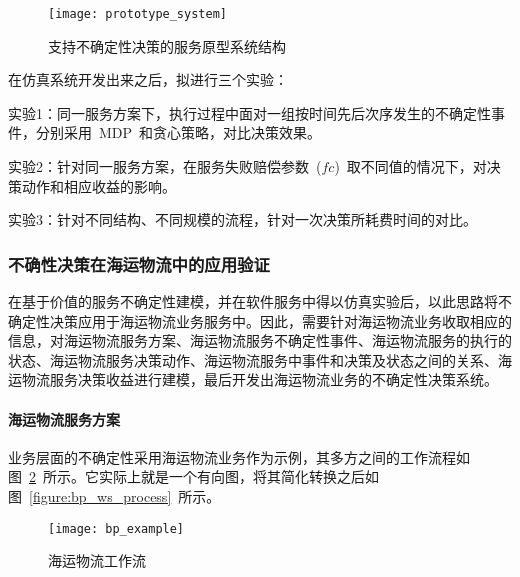 \begin{figure}[htbp]
    \centering
    \texttt{[image: prototype\_system]}
    \caption{支持不确定性决策的服务原型系统结构}\label{figure:prototype_system}
    \vspace{-1em}
\end{figure}


在仿真系统开发出来之后，拟进行三个实验：

实验1：同一服务方案下，执行过程中面对一组按时间先后次序发生的不确定性事件，分别采用~MDP~和贪心策略，对比决策效果。

实验2：针对同一服务方案，在服务失败赔偿参数~($fc$)~取不同值的情况下，对决策动作和相应收益的影响。

实验3：针对不同结构、不同规模的流程，针对一次决策所耗费时间的对比。

\subsubsection{不确性决策在海运物流中的应用验证}

在基于价值的服务不确定性建模，并在软件服务中得以仿真实验后，以此思路将不确定性决策应用于海运物流业务服务中。因此，需要针对海运物流业务收取相应的信息，对海运物流服务方案、海运物流服务不确定性事件、海运物流服务的执行的状态、海运物流服务决策动作、海运物流服务中事件和决策及状态之间的关系、海运物流服务决策收益进行建模，最后开发出海运物流业务的不确定性决策系统。

\setcounter{paragraph}{0}
\paragraph{海运物流服务方案}

%

业务层面的不确定性采用海运物流业务作为示例，其多方之间的工作流程如图~\ref{figure:bp_example}~所示。它实际上就是一个有向图，将其简化转换之后如图~\ref{figure:bp_ws_process}~所示。

\begin{figure}[htbp]
    \centering
    \texttt{[image: bp\_example]}
    \caption{海运物流工作流}\label{figure:bp_example}
    \vspace{-1em}
\end{figure}

